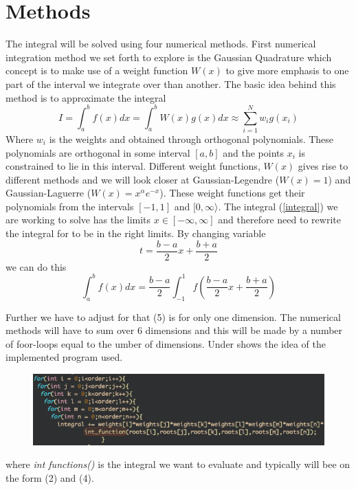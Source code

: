 \documentclass[twoside,twocolumn]{article}
\begin{document}

\section{Methods}
The integral will be solved using four numerical methods. First numerical integration method  we set forth to explore is the Gaussian Quadrature which concept is to make use of a weight function $W(x)$ to give more emphasis to one part of the interval we integrate over than another. The basic idea behind this method is to approximate the integral
\begin{equation}
   I = \int_{a}^{b}f(x)dx = \int_{a}^{b} W(x)g(x) dx \approx\sum_{i=1}^{N} w_ig(x_i)
\end{equation}
Where $w_i$ is the weights and obtained through orthogonal polynomials. These polynomials are orthogonal in some interval $[a,b]$ and the points $x_i$ is constrained to lie in this interval. Different weight functions, $W(x)$ gives rise to different methods and we will look  closer at Gaussian-Legendre ($W(x) = 1$) and Gaussian-Laguerre ($W(x)  = x^\alpha e^{-x}$). These weight functions get their polynomials from the intervals $[-1,1]$ and $[0,\infty\rangle$. The integral (\ref{integral})
we are working to solve has the limits $x\in[-\infty,\infty]$ and therefore need to rewrite the integral for to be in the right limits. By changing variable
\begin{equation}
		t= \frac{b-a}{2}x + \frac{b+a}{2}
\end{equation}
we can do this
\begin{equation}
		\int_a^b f(x) dx = \frac{b-a}{2} \int_{-1}^1f( \frac{b-a}{2}x + \frac{b+a}{2})
\end{equation}

Further we have to adjust for that (5) is for only one dimension. The numerical methods will have to sum over 6 dimensions and this will be made by a number of foor-loops equal to the umber of dimensions. Under shows the idea of the implemented program used. 

\begin{figure}[h]
\center
\includegraphics[scale=0.4]{foor.png}

\end{figure}
where \textit{int functions()} is the integral we want to evaluate and typically will bee on the form (2) and (4).
\end{document}
